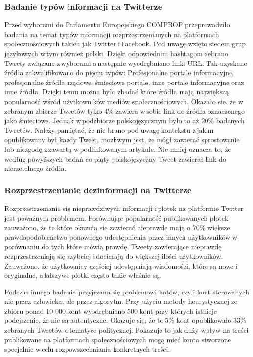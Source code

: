 \subsubsection{Badanie typów informacji na Twitterze}
Przed wyborami do Parlamentu Europejskiego COMPROP przeprowadziło badania na temat typów informacji rozprzestrzenianych na platformach społecznościowych takich jak Twitter i\,Facebook\cite{marchal2019junk}. Pod uwagę wzięto siedem grup językowych w\,tym również polski. Dzięki odpowiednim hashtagom zebrano Tweety związane z\,wyborami a\,następnie wyodrębniono linki URL. Tak uzyskane źródła zakwalifikowano do pięciu typów: Profesjonalne portale informacyjne, profesjonalne źródła rządowe, śmieciowe portale, inne portale informacyjne oraz inne źródła. Dzięki temu można było zbadać które źródła mają największą popularność wśród użytkowników mediów społecznościowych. Okazało się, że w\,zebranym zbiorze Tweetów tylko 4\% zawiera w\,sobie link do źródła oznaczonego jako śmieciowe. Jednak w\,podzbiorze polskojęzycznym było to aż 20\% badanych Tweetów. Należy pamiętać, że nie brano pod uwagę kontekstu z\,jakim opublikowany był każdy Tweet, możliwym jest, że mógł zawierać sprostowanie lub niezgodę z\,zawartą w\,podlinkowanym artykule. Nie mniej oznacza to, że według powyższych badań co piąty polskojęzyczny Tweet zawierał link do nierzetelnego źródła.  
\subsubsection{Rozprzestrzenianie dezinformacji na Twitterze}
Rozprzestrzenianie się nieprawdziwych informacji i\,plotek na platformie Twitter jest poważnym problemem. Porównując popularność publikowanych plotek zauważono, że te które okazują się zawierać nieprawdę mają o 70\% większe prawdopodobieństwo ponownego udostępnienia przez innych użytkowników w\,porównaniu do tych które mówią prawdę\cite{vosoughi2018spread}. Tweety zawierające nieprawdę rozprzestrzeniają się szybciej i\,docierają do większej ilości użytkowników. Zauważono, że użytkownicy częściej udostępniają wiadomości, które są nowe i\,oryginalne, a\,fałszywe plotki często takie właśnie są. 
\par
Podczas innego badania przyjrzano się problemowi botów, czyli kont sterowanych nie przez człowieka, ale przez algorytm\cite{gorwa2017computational}. Przy użyciu metody heurystycznej ze zbioru ponad 10 000 kont wyodrębniono 500 kont przy których istnieje podejrzenie, że nie są autentyczne. Okazuje się, że te 5\% kont opublikowało 33\% zebranych Tweetów o\,tematyce politycznej. Pokazuje to jak duży wpływ na treści publikowane na platformach społecznościowych mogą mieć konta stworzone specjalnie w\,celu rozpowszechniania konkretnych treści. 
